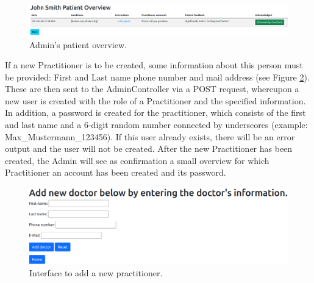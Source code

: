 \documentclass[]{report}
\begin{document}
\begin{figure}[h]
    \centering
    \includegraphics[width=1\textwidth]{Patient_Overview.png}
    \caption{Admin's patient overview.}
    \label{fig:patient_overview}
\end{figure}
If a new Practitioner is to be created, some information about this person must be provided: First and Last name phone number and mail address (see Figure \ref{fig:add_practitioner}). These are then sent to the AdminController via a POST request, whereupon a new user is created with the role of a Practitioner and the specified information. In addition, a password is created for the practitioner, which consists of the first and last name and a 6-digit random number connected by underscores (example: Max\_Mustermann\_123456). If this user already exists, there will be an error output and the user will not be created. After the new Practitioner has been created, the Admin will see as confirmation a small overview for which Practitioner an account has been created and its password.\\
\begin{figure}[h]
    \centering
    \includegraphics[width=1\textwidth]{Add_Practitioner.png}
    \caption{Interface to add a new practitioner.}
    \label{fig:add_practitioner}
\end{figure}
\end{document}
